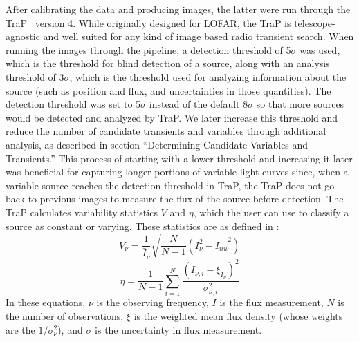 \documentclass[12pt]{article}
\begin{document}
After calibrating the data and producing images, the latter were run through the TraP~\citep{2015A&C....11...25S} version 4. While originally designed for LOFAR, the TraP is telescope-agnostic and well suited for any kind of image based radio transient search. When running the images through the pipeline, a detection threshold of 5$\sigma$ was used, which is the threshold for blind detection of a source, along with an analysis threshold of $3\sigma$, which is the threshold used for analyzing information about the source (such as position and flux, and uncertainties in those quantities). The detection threshold was set to 5$\sigma$ instead of the default 8$\sigma$ so that more sources would be detected and analyzed by TraP. We later increase this threshold and reduce the number of candidate transients and variables through additional analysis, as described in section ``Determining Candidate Variables and Transients.'' This process of starting with a lower threshold and increasing it later was beneficial for capturing longer portions of variable light curves since, when a variable source reaches the detection threshold in TraP, the TraP does not go back to previous images to measure the flux of the source before detection. The TraP calculates variability statistics $V$ and $\eta$, which the user can use to classify a source as constant or varying. These statistics are as defined in \citet{2015A&C....11...25S}:
\begin{equation}\label{Veqn}
    V_{\nu} = \frac{1}{\bar{I}_{\nu}}\sqrt{\frac{N}{N-1} (\bar{I_{\nu}^2} - \bar{I_{nu}}^2)}
\end{equation}
\begin{equation}\label{etaeqn}
    \eta =  \frac{1}{N-1} \sum_{i=1}^{N} \frac{(I_{\nu,i} - \xi_{I_{\nu}})^2}{\sigma_{\nu,i}^2}   
\end{equation}
In these equations, $\nu$ is the observing frequency, $I$ is the flux measurement, $N$ is the number of observations, $\xi$ is the weighted mean flux density (whose weights are the $1/\sigma_{\nu}^2$), and $\sigma$ is the uncertainty in flux measurement. 
\end{document}
